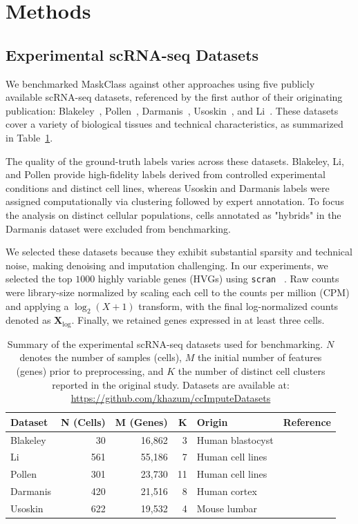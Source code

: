 \documentclass[sigconf,review]{acmart}
\theoremstyle{plain}
\theoremstyle{definition}
\theoremstyle{remark}
\newcommand{\ccimputedatasetslink}{%
  \url{https://github.com/khazum/ccImputeDatasets}}
\begin{document}
\section{Methods}
\label{sec:methods}
\subsection{Experimental scRNA-seq Datasets}
We benchmarked MaskClass against other approaches using five publicly available scRNA-seq datasets, referenced by the first author of their originating publication: Blakeley~\cite{blakeley2015defining}, Pollen~\cite{pollen2014low}, Darmanis~\cite{darmanis2015survey}, Usoskin~\cite{usoskin2015unbiased}, and Li~\cite{li2017reference}. These datasets cover a variety of biological tissues and technical characteristics, as summarized in Table~\ref{tab:datasets}.

The quality of the ground-truth labels varies across these datasets. Blakeley,
Li, and Pollen provide high-fidelity labels derived from controlled
experimental conditions and distinct cell lines, whereas Usoskin and Darmanis
labels were assigned computationally via clustering followed by expert
annotation. To focus the analysis on distinct cellular populations, cells
annotated as "hybrids" in the Darmanis dataset were excluded from benchmarking.

We selected these datasets because they exhibit substantial sparsity and technical noise, making denoising and imputation challenging. In our experiments, we selected the top $1000$ highly variable genes (HVGs) using \texttt{scran} ~\cite{lun2016step}. Raw counts were library-size normalized by scaling each cell to the counts per million (CPM) and applying a $\log_2(X+1)$ transform, with the final log-normalized counts denoted as $\mathbf{X}_{\log}$. Finally, we retained genes expressed in at least three cells.

\begin{table}[t]
\caption{Summary of the experimental scRNA-seq datasets used for benchmarking. $N$ denotes the number of samples (cells), $M$ the initial number of features (genes) prior to preprocessing, and $K$ the number of distinct cell clusters reported in the original study. Datasets are available at: \ccimputedatasetslink}
\label{tab:datasets}
\centering
\begin{tabular}{@{} l r r r l l @{}}
\toprule
\textbf{Dataset} & \textbf{N (Cells)} & \textbf{M (Genes)} & \textbf{K} & \textbf{Origin} & \textbf{Reference} \\
\midrule
Blakeley & 30 & 16,862 & 3 & Human blastocyst & \cite{blakeley2015defining} \\
Li & 561 & 55,186 & 7 & Human cell lines & \cite{li2017reference} \\
Pollen & 301 & 23,730 & 11 & Human cell lines & \cite{pollen2014low} \\
Darmanis & 420 & 21,516 & 8 & Human cortex & \cite{darmanis2015survey} \\
Usoskin & 622 & 19,532 & 4 & Mouse lumbar & \cite{usoskin2015unbiased} \\
\bottomrule
\end{tabular}
\end{table}
\end{document}
